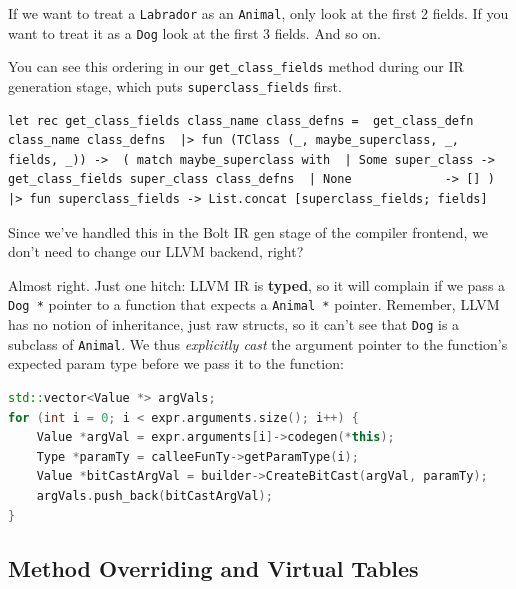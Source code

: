 If we want to treat a \texttt{Labrador} as an \texttt{Animal}, only look
at the first 2 fields. If you want to treat it as a \texttt{Dog} look at
the first 3 fields. And so on.

You can see this ordering in our \texttt{get\_class\_fields} method
during our IR generation stage, which puts \texttt{superclass\_fields}
first.

%

\begin{lstlisting}[language=caml,caption={ir\_gen\_env.ml}]
let rec get_class_fields class_name class_defns =  get_class_defn class_name class_defns  |> fun (TClass (_, maybe_superclass, _, fields, _)) ->  ( match maybe_superclass with  | Some super_class -> get_class_fields super_class class_defns  | None             -> [] )  |> fun superclass_fields -> List.concat [superclass_fields; fields]
\end{lstlisting}

Since we've handled this in the Bolt IR gen stage of the compiler
frontend, we don't need to change our LLVM backend, right?

Almost right. Just one hitch: LLVM IR is \textbf{typed}, so it will
complain if we pass a \texttt{Dog\ *} pointer to a function that expects
a \texttt{Animal\ *} pointer. Remember, LLVM has no notion of
inheritance, just raw structs, so it can't see that \texttt{Dog} is a
subclass of \texttt{Animal}. We thus \emph{explicitly cast} the argument
pointer to the function's expected param type before we pass it to the
function:

%

\begin{lstlisting}[language=C++,caption={expr\_codegen.cc}]
std::vector<Value *> argVals;  
for (int i = 0; i < expr.arguments.size(); i++) {
    Value *argVal = expr.arguments[i]->codegen(*this);
    Type *paramTy = calleeFunTy->getParamType(i);
    Value *bitCastArgVal = builder->CreateBitCast(argVal, paramTy);
    argVals.push_back(bitCastArgVal);  
}
\end{lstlisting}

\hypertarget{method-overriding-and-virtual-tables}{%
\subsection{\texorpdfstring{\protect\hyperlink{method-overriding-and-virtual-tables}{}Method
Overriding and Virtual
Tables}{Method Overriding and Virtual Tables}}\label{method-overriding-and-virtual-tables}}

